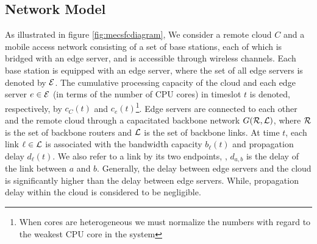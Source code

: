 \subsection{Network Model}
As illustrated in figure \ref{fig:mecsfcdiagram}, We consider a remote cloud $C$ and a mobile access network consisting of a set of base stations, each of which is bridged with an edge server, and is accessible through wireless channels.
Each base station is equipped with an edge server, where the set of all edge servers is denoted by $\mathcal{E}$. The cumulative processing capacity of the cloud and each edge server $e\in\mathcal{E}$ (in terms of the number of CPU cores) in timeslot $t$ is denoted, respectively, by $c_{C}(t)$ and $c_{e}(t)$\footnote{When cores are heterogeneous we must normalize the numbers with regard to the weakest CPU core in the system}. Edge servers are connected to each other and the remote cloud through a capacitated backbone network $G(\mathcal{R}, \mathcal{L})$, where $\mathcal{R}$ is the set of backbone routers and $\mathcal{L}$ is the set of backbone links. At time $t$, each link $\ell\in\mathcal{L}$ is associated with the bandwidth capacity $b_{\ell}(t)$ and propagation delay $d_{\ell}(t)$. We also refer to a link by its two endpoints, \eg, $d_{a,b}$ is the delay of the link between $a$ and $b$. Generally, the delay between edge servers and the cloud is significantly higher than the delay between edge servers. While, propagation delay within the cloud is considered to be negligible. 

